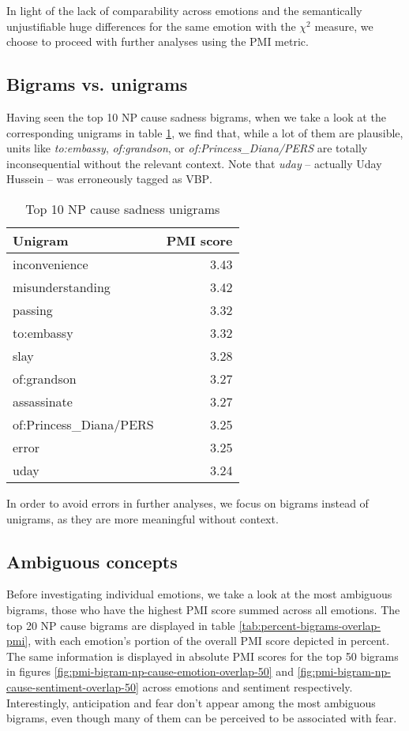 In light of the lack of comparability across emotions and the semantically unjustifiable huge differences for the same emotion with the $\chi^{2}$ measure, we choose to proceed with further analyses using the PMI metric.

\subsection{Bigrams vs. unigrams}

Having seen the top 10 NP cause sadness bigrams, when we take a look at the corresponding unigrams in table \ref{tab:sadness-unigrams}, we find that, while a lot of them are plausible, units like \textit{to:embassy}, \textit{of:grandson}, or \textit{of:Princess\_Diana/PERS} are totally inconsequential without the relevant context. Note that \textit{uday} -- actually Uday Hussein -- was erroneously tagged as \textsc{VBP}.

\begin{table}[h]
\centering
\begin{tabular}{l|r}
{\bf Unigram}  & {\bf PMI score} \\\hline
inconvenience  & 3.43            \\
misunderstanding  & 3.42            \\
passing  & 3.32            \\
to:embassy  & 3.32            \\
slay & 3.28            \\
of:grandson & 3.27            \\
assassinate & 3.27            \\
of:Princess\_Diana/PERS & 3.25            \\
error & 3.25            \\
uday & 3.24              
\end{tabular}
\caption{Top 10 NP cause sadness unigrams}
\label{tab:sadness-unigrams}
\end{table}

In order to avoid errors in further analyses, we focus on bigrams instead of unigrams, as they are more meaningful without context.

\subsection{Ambiguous concepts}

Before investigating individual emotions, we take a look at the most ambiguous bigrams, those who have the highest PMI score summed across all emotions. The top 20 NP cause bigrams are displayed in table \ref{tab:percent-bigrams-overlap-pmi}, with each emotion's portion of the overall PMI score depicted in percent. The same information is displayed in absolute PMI scores for the top 50 bigrams in figures \ref{fig:pmi-bigram-np-cause-emotion-overlap-50} and \ref{fig:pmi-bigram-np-cause-sentiment-overlap-50} across emotions and sentiment respectively. 
Interestingly, anticipation and fear don't appear among the most ambiguous bigrams, even though many of them can be perceived to be associated with fear.

